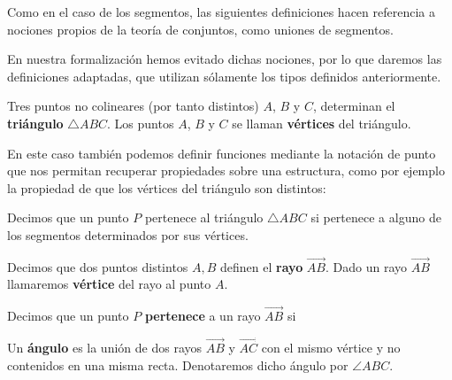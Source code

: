 Como en el caso de los segmentos, las siguientes definiciones hacen referencia
a nociones propios de la teoría de conjuntos, como uniones de segmentos.

En nuestra formalización hemos evitado dichas nociones, por lo que daremos las
definiciones adaptadas, que utilizan sólamente los tipos definidos
anteriormente.

\begin{defin*}[Triángulos]
	Tres puntos no colineares (por tanto distintos) $A$, $B$ y $C$, determinan
	el \textbf{triángulo} $\triangle ABC$. Los puntos $A$, $B$ y $C$ se llaman
	\textbf{vértices} del triángulo.
\end{defin*}


En este caso también podemos definir funciones mediante la notación de punto que
nos permitan recuperar propiedades sobre una estructura, como por ejemplo la
propiedad de que los vértices del triángulo son distintos:


\begin{defin*}
	Decimos que un punto $P$ pertenece al triángulo $\triangle ABC$ si pertenece
	a alguno de los segmentos determinados por sus vértices.
\end{defin*}

\begin{defin*}

	Decimos que dos puntos distintos $A, B$ definen el \textbf{rayo}
	$\overrightarrow{AB}$. Dado un rayo $\overrightarrow{AB}$ llamaremos
	\textbf{vértice} del rayo al punto $A$.

	Decimos que un punto $P$ \textbf{pertenece} a un rayo $\overrightarrow{AB}$
	si

\end{defin*}


\begin{defin*}[Ángulos]
	Un \textbf{ángulo} es la unión de dos rayos $\overrightarrow{AB}$ y
	$\overrightarrow{AC}$ con el mismo vértice y no contenidos en una misma recta.
	Denotaremos dicho ángulo por $\angle ABC$.
\end{defin*}

